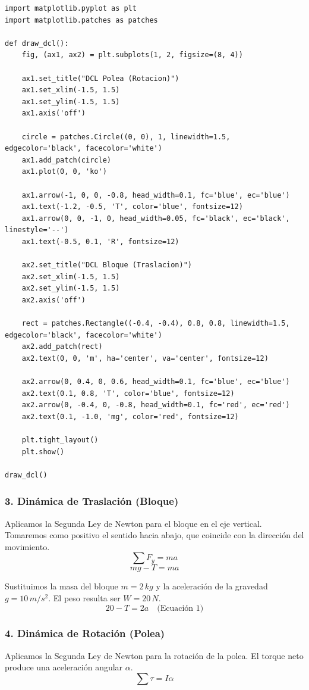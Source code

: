 \documentclass[12pt, a4paper]{article}
\begin{document}
\begin{lstlisting}
import matplotlib.pyplot as plt
import matplotlib.patches as patches

def draw_dcl():
    fig, (ax1, ax2) = plt.subplots(1, 2, figsize=(8, 4))
    
    ax1.set_title("DCL Polea (Rotacion)")
    ax1.set_xlim(-1.5, 1.5)
    ax1.set_ylim(-1.5, 1.5)
    ax1.axis('off')
    
    circle = patches.Circle((0, 0), 1, linewidth=1.5, edgecolor='black', facecolor='white')
    ax1.add_patch(circle)
    ax1.plot(0, 0, 'ko')
    
    ax1.arrow(-1, 0, 0, -0.8, head_width=0.1, fc='blue', ec='blue')
    ax1.text(-1.2, -0.5, 'T', color='blue', fontsize=12)
    ax1.arrow(0, 0, -1, 0, head_width=0.05, fc='black', ec='black', linestyle='--')
    ax1.text(-0.5, 0.1, 'R', fontsize=12)
    
    ax2.set_title("DCL Bloque (Traslacion)")
    ax2.set_xlim(-1.5, 1.5)
    ax2.set_ylim(-1.5, 1.5)
    ax2.axis('off')
    
    rect = patches.Rectangle((-0.4, -0.4), 0.8, 0.8, linewidth=1.5, edgecolor='black', facecolor='white')
    ax2.add_patch(rect)
    ax2.text(0, 0, 'm', ha='center', va='center', fontsize=12)
    
    ax2.arrow(0, 0.4, 0, 0.6, head_width=0.1, fc='blue', ec='blue')
    ax2.text(0.1, 0.8, 'T', color='blue', fontsize=12)
    ax2.arrow(0, -0.4, 0, -0.8, head_width=0.1, fc='red', ec='red')
    ax2.text(0.1, -1.0, 'mg', color='red', fontsize=12)
    
    plt.tight_layout()
    plt.show()

draw_dcl()
\end{lstlisting}

\subsubsection*{3. Dinámica de Traslación (Bloque)}
Aplicamos la Segunda Ley de Newton para el bloque en el eje vertical. Tomaremos como positivo el sentido hacia abajo, que coincide con la dirección del movimiento.
$$\sum F_y = m a$$
$$m g - T = m a$$

Sustituimos la masa del bloque $m = 2 \, \si{kg}$ y la aceleración de la gravedad $g = 10 \, \si{m/s^2}$. El peso resulta ser $W = 20 \, \si{N}$.
$$20 - T = 2 a \quad \text{(Ecuación 1)}$$

\subsubsection*{4. Dinámica de Rotación (Polea)}
Aplicamos la Segunda Ley de Newton para la rotación de la polea. El torque neto produce una aceleración angular $\alpha$.
$$\sum \tau = I \alpha$$
\end{document}

